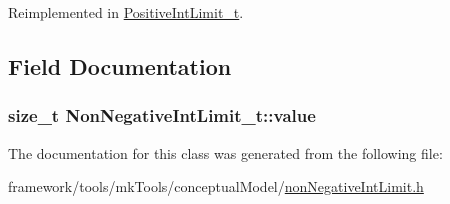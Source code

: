 Reimplemented in \hyperlink{struct_positive_int_limit__t_aa03a2f83b277e9bb12e894f8cc9c286a}{Positive\+Int\+Limit\+\_\+t}.



\subsection{Field Documentation}
\subsubsection[{\texorpdfstring{value}{value}}]{\setlength{\rightskip}{0pt plus 5cm}size\+\_\+t Non\+Negative\+Int\+Limit\+\_\+t\+::value\hspace{0.3cm}{\ttfamily [protected]}}\hypertarget{class_non_negative_int_limit__t_ac6fe50d9fcbdaf452a31178bfa2dff56}{}\label{class_non_negative_int_limit__t_ac6fe50d9fcbdaf452a31178bfa2dff56}


The documentation for this class was generated from the following file\+:\begin{DoxyCompactItemize}
\item 
framework/tools/mk\+Tools/conceptual\+Model/\hyperlink{non_negative_int_limit_8h}{non\+Negative\+Int\+Limit.\+h}\end{DoxyCompactItemize}
